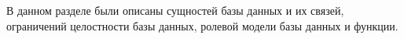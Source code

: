 В данном разделе были описаны сущностей базы данных и их связей, ограничений целостности базы данных, ролевой модели базы данных и функции.

%
%
%
%
